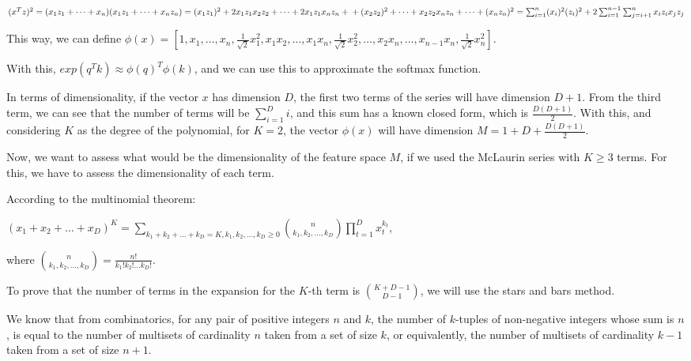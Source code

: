 \documentclass{article}
\begin{document}
\medskip

$ (x^Tz)^2 = (x_1z_1 + \dots + x_n)(x_1z_1 + \dots + x_nz_n) = (x_1z_1)^2 + 2x_1z_1x_2z_2 + \dots + 2x_1z_1x_nz_n + \\
+ (x_2z_2)^2 + \dots + x_2z_2x_nz_n + \dots + (x_nz_n)^2 = \sum_{i=1}^n (x_i)^2(z_i)^2 + 2\sum_{i=1}^{n-1} \sum_{j=i+1}^{n} x_iz_ix_jz_j \\
$

This way, we can define $\phi(x) = [1, x_1, \dots, x_n, 
\frac{1}{\sqrt{2}}x_1^{2}, x_1x_2, \dots, x_1x_n, \frac{1}{\sqrt{2}}x_2^{2}, \dots, 
x_2x_n, \dots, x_{n-1}x_n , \frac{1}{\sqrt{2}}x_n^{2}]$.

With this, $exp(q^Tk) \approx \phi(q)^T \phi(k)$, and we can use this to approximate the softmax function.

\bigskip

In terms of dimensionality, if the vector $x$ has dimension $D$, the first two terms of the series will have dimension $D + 1$. From the 
third term, we can see that the number of terms will be $\sum_{i=1}^{D} i$, and this sum has a known closed form, which is $\frac{D(D+1)}{2}$. 
With this, and considering $K$ as the degree of the polynomial, for $K = 2$, the vector $\phi(x)$ will have dimension $M = 1 + D + \frac{D(D+1)}{2}$.

\bigskip

Now, we want to assess what would be the dimensionality of the feature space $M$, if we used the McLaurin series with $K \geq 3$ terms.
For this, we have to assess the dimensionality of each term.

\bigskip

According to the multinomial theorem:

\medskip

$ (x_1 + x_2 + \dots + x_D)^K = \sum_{k_1 + k_2 + \dots + k_D = K, k_1, k_2, \dots, k_D\geq0} \binom{n}{k_1, k_2, \dots, k_D} \prod_{t=1}^D x_t^{k_t}$,

where $\binom{n}{k_1, k_2, \dots, k_D} = \frac{n!}{k_1!k_2!\dots k_D!}$.

\bigskip

To prove that the number of terms in the expansion for the $K$-th term is $\binom{K + D - 1}{D - 1}$, we will use the stars and bars method.

We know that from combinatorics, for any pair of positive integers $n$ and $k$, the number of $k$-tuples of non-negative integers whose sum is $n$, is equal to the number of 
multisets of cardinality $n$ taken from a set of size $k$, or equivalently, the number of multisets of cardinality $k - 1$ taken from a set of size $n + 1$.
\end{document}
